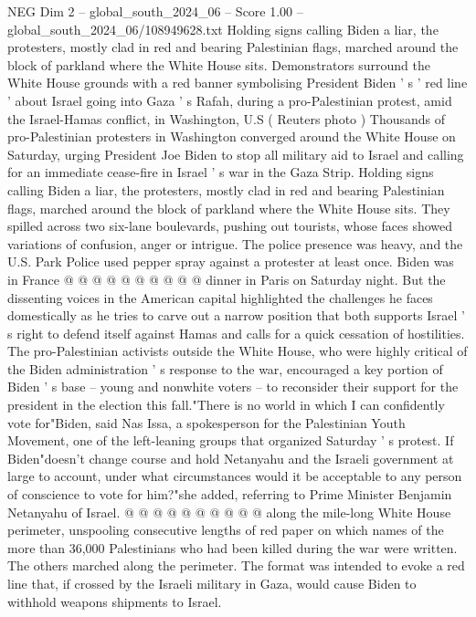 \begin{textsample}{NEG Dim 2 – global\_south\_2024\_06 – Score 1.00 – global\_south\_2024\_06/108949628.txt}  \label{ex:f2_neg_398}
Holding signs calling Biden a liar, the protesters, mostly clad in red and bearing Palestinian flags, marched around the block of parkland where the White House sits.
Demonstrators surround the White House grounds with a red banner symbolising President Biden ' s ' red line ' about Israel going into Gaza ' s Rafah, during a pro-Palestinian protest, amid the Israel-Hamas conflict, in Washington, U.S ( Reuters photo ) Thousands of pro-Palestinian protesters in Washington converged around the White House on Saturday, urging President Joe Biden to stop all military aid to Israel and calling for an immediate cease-fire in Israel ' s war in the Gaza Strip.
Holding signs calling Biden a liar, the protesters, mostly clad in red and bearing Palestinian flags, marched around the block of parkland where the White House sits.
They spilled across two six-lane boulevards, pushing out tourists, whose faces showed variations of confusion, anger or intrigue.
The police presence was heavy, and the U.S.
Park Police used pepper spray against a protester at least once.
Biden was in France @ @ @ @ @ @ @ @ @ @ dinner in Paris on Saturday night.
But the dissenting voices in the American capital highlighted the challenges he faces domestically as he tries to carve out a narrow position that both supports Israel ' s right to defend itself against Hamas and calls for a quick cessation of hostilities.
The pro-Palestinian activists outside the White House, who were highly critical of the Biden administration ' s response to the war, encouraged a key portion of Biden ' s base -- young and nonwhite voters -- to reconsider their support for the president in the election this fall."There is no world in which I can confidently vote for"Biden, said Nas Issa, a spokesperson for the Palestinian Youth Movement, one of the left-leaning groups that organized Saturday ' s protest.
If Biden"doesn't change course and hold Netanyahu and the Israeli government at large to account, under what circumstances would it be acceptable to any person of conscience to vote for him?"she added, referring to Prime Minister Benjamin Netanyahu of Israel. @ @ @ @ @ @ @ @ @ @ along the mile-long White House perimeter, unspooling consecutive lengths of red paper on which names of the more than 36,000 Palestinians who had been killed during the war were written.
The others marched along the perimeter.
The format was intended to evoke a red line that, if crossed by the Israeli military in Gaza, would cause Biden to withhold weapons shipments to Israel.

\end{textsample}
